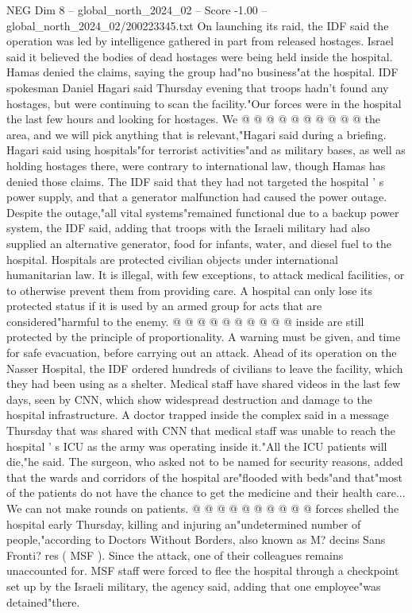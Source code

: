 \begin{textsample}{NEG Dim 8 – global\_north\_2024\_02 – Score -1.00 – global\_north\_2024\_02/200223345.txt}
On launching its raid, the IDF said the operation was led by intelligence gathered in part from released hostages.
Israel said it believed the bodies of dead hostages were being held inside the hospital.
Hamas denied the claims, saying the group had"no business"at the hospital.
IDF spokesman Daniel Hagari said Thursday evening that troops hadn't found any hostages, but were continuing to scan the facility."Our forces were in the hospital the last few hours and looking for hostages.
We @ @ @ @ @ @ @ @ @ @ the area, and we will pick anything that is relevant,"Hagari said during a briefing.
Hagari said using hospitals"for terrorist activities"and as military bases, as well as holding hostages there, were contrary to international law, though Hamas has denied those claims.
The IDF said that they had not targeted the hospital ' s power supply, and that a generator malfunction had caused the power outage.
Despite the outage,"all vital systems"remained functional due to a backup power system, the IDF said, adding that troops with the Israeli military had also supplied an alternative generator, food for infants, water, and diesel fuel to the hospital.
Hospitals are protected civilian objects under international humanitarian law.
It is illegal, with few exceptions, to attack medical facilities, or to otherwise prevent them from providing care.
A hospital can only lose its protected status if it is used by an armed group for acts that are considered"harmful to the enemy. @ @ @ @ @ @ @ @ @ @ inside are still protected by the principle of proportionality.
A warning must be given, and time for safe evacuation, before carrying out an attack.
Ahead of its operation on the Nasser Hospital, the IDF ordered hundreds of civilians to leave the facility, which they had been using as a shelter.
Medical staff have shared videos in the last few days, seen by CNN, which show widespread destruction and damage to the hospital infrastructure.
A doctor trapped inside the complex said in a message Thursday that was shared with CNN that medical staff was unable to reach the hospital ' s ICU as the army was operating inside it."All the ICU patients will die,"he said.
The surgeon, who asked not to be named for security reasons, added that the wards and corridors of the hospital are"flooded with beds"and that"most of the patients do not have the chance to get the medicine and their health care...
We can not make rounds on patients. @ @ @ @ @ @ @ @ @ @ forces shelled the hospital early Thursday, killing and injuring an"undetermined number of people,"according to Doctors Without Borders, also known as M? decins Sans Fronti? res ( MSF ).
Since the attack, one of their colleagues remains unaccounted for.
MSF staff were forced to flee the hospital through a checkpoint set up by the Israeli military, the agency said, adding that one employee"was detained"there.

\end{textsample}
